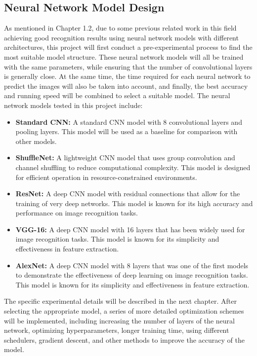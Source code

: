 \documentclass[twocolumn]{article}
\begin{document}
    \subsection{Neural Network Model Design}
    As mentioned in Chapter 1.2, due to some previous related work in this field achieving good recognition results using neural network models with different architectures, this project will first conduct a pre-experimental process to find the most suitable model structure. These neural network models will all be trained with the same parameters, while ensuring that the number of convolutional layers is generally close. At the same time, the time required for each neural network to predict the images will also be taken into account, and finally, the best accuracy and running speed will be combined to select a suitable model. The neural network models tested in this project include:
    \begin{itemize}
        \item \textbf{Standard CNN:} A standard CNN model with 8 convolutional layers and pooling layers. This model will be used as a baseline for comparison with other models.
        \item \textbf{ShuffleNet:} A lightweight CNN model that uses group convolution and channel shuffling to reduce computational complexity. This model is designed for efficient operation in resource-constrained environments.
        \item \textbf{ResNet:} A deep CNN model with residual connections that allow for the training of very deep networks. This model is known for its high accuracy and performance on image recognition tasks.
        \item \textbf{VGG-16:} A deep CNN model with 16 layers that has been widely used for image recognition tasks. This model is known for its simplicity and effectiveness in feature extraction.
        \item \textbf{AlexNet:} A deep CNN model with 8 layers that was one of the first models to demonstrate the effectiveness of deep learning on image recognition tasks. This model is known for its simplicity and effectiveness in feature extraction.
    \end{itemize}
    The specific experimental details will be described in the next chapter. After selecting the appropriate model, a series of more detailed optimization schemes will be implemented, including increasing the number of layers of the neural network, optimizing hyperparameters, longer training time, using different schedulers, gradient descent, and other methods to improve the accuracy of the model.
\end{document}
